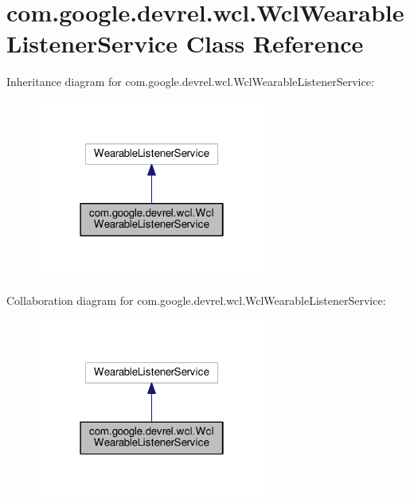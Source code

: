 \hypertarget{classcom_1_1google_1_1devrel_1_1wcl_1_1WclWearableListenerService}{}\section{com.\+google.\+devrel.\+wcl.\+Wcl\+Wearable\+Listener\+Service Class Reference}
\label{classcom_1_1google_1_1devrel_1_1wcl_1_1WclWearableListenerService}


Inheritance diagram for com.\+google.\+devrel.\+wcl.\+Wcl\+Wearable\+Listener\+Service\+:\nopagebreak
\begin{figure}[H]
\begin{center}
\leavevmode
\includegraphics[width=214pt]{da/dae/classcom_1_1google_1_1devrel_1_1wcl_1_1WclWearableListenerService__inherit__graph}
\end{center}
\end{figure}


Collaboration diagram for com.\+google.\+devrel.\+wcl.\+Wcl\+Wearable\+Listener\+Service\+:\nopagebreak
\begin{figure}[H]
\begin{center}
\leavevmode
\includegraphics[width=214pt]{d6/d3b/classcom_1_1google_1_1devrel_1_1wcl_1_1WclWearableListenerService__coll__graph}
\end{center}
\end{figure}
